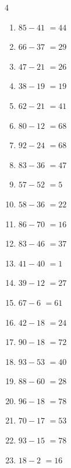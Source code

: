 \begin{multicols}{4}
\begin{enumerate}
  \item $85-41$
        $=44$

  \item $66-37$
        $=29$

  \item $47-21$
        $=26$

  \item $38-19$
        $=19$

  \item $62-21$
        $=41$

  \item $80-12$
        $=68$

  \item $92-24$
        $=68$

  \item $83-36$
        $=47$

  \item $57-52$
        $=5$

  \item $58-36$
        $=22$

  \item $86-70$
        $=16$

  \item $83-46$
        $=37$

\columnbreak %

  \item $41-40$
        $=1$

  \item $39-12$
        $=27$

  \item $67-6$
        $=61$

  \item $42-18$
        $=24$

  \item $90-18$
        $=72$

  \item $93-53$
        $=40$

  \item $88-60$
        $=28$

  \item $96-18$
        $=78$

  \item $70-17$
        $=53$

  \item $93-15$
        $=78$

  \item $18-2$
        $=16$


\end{enumerate}
\end{multicols}

